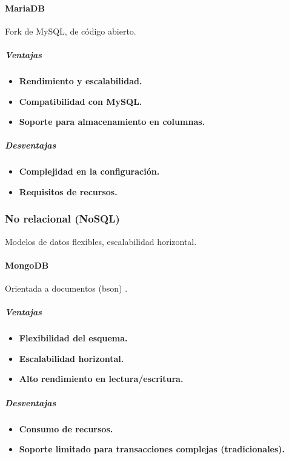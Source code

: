 \paragraph{MariaDB}
Fork de MySQL, de código abierto.
\subparagraph{Ventajas}
\begin{itemize}
    \item \textbf{Rendimiento y escalabilidad.}
    \item \textbf{Compatibilidad con MySQL.}
    \item \textbf{Soporte para almacenamiento en columnas.}
\end{itemize}
\subparagraph{Desventajas}
\begin{itemize}
    \item \textbf{Complejidad en la configuración.}
    \item \textbf{Requisitos de recursos.}
\end{itemize}

\subsubsection{No relacional (NoSQL)}
Modelos de datos flexibles, escalabilidad horizontal.

\paragraph{MongoDB}
Orientada a documentos (\gls{bson}) \cite{noauthor_mongodb_nodate}.
\subparagraph{Ventajas}
\begin{itemize}
    \item \textbf{Flexibilidad del esquema.}
    \item \textbf{Escalabilidad horizontal.}
    \item \textbf{Alto rendimiento en lectura/escritura.}
\end{itemize}
\subparagraph{Desventajas}
\begin{itemize}
    \item \textbf{Consumo de recursos.}
    \item \textbf{Soporte limitado para transacciones complejas (tradicionales).}
\end{itemize}

